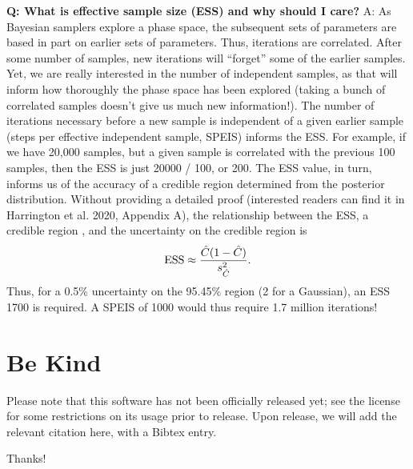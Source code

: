\documentclass[letterpaper, 12pt]{article}
\begin{document}
\noindent \textbf{Q: What is effective sample size (ESS) and why should I care?}
A: As Bayesian samplers explore a phase space, the subsequent sets of parameters
are based in part on earlier sets of parameters.  Thus, iterations are 
correlated.  After some number of samples, new iterations will ``forget'' some 
of the earlier samples.  Yet, we are really interested in the number of 
independent samples, as that will inform how thoroughly the phase space has 
been explored (taking a bunch of correlated samples doesn't give us much new 
information!).  The number of iterations necessary before a new sample is 
independent of a given earlier sample (steps per effective independent sample, 
SPEIS) informs the ESS.  For example, if we have 20,000 samples, but a given 
sample is correlated with the previous 100 samples, then the ESS is just 
20000 / 100, or 200.  The ESS value, in turn, informs us of the accuracy of 
a credible region determined from the posterior distribution.  Without 
providing a detailed proof (interested readers can find it in Harrington et 
al. 2020, Appendix A), the relationship between the ESS, a credible region 
, and the uncertainty on the credible region 
 is
\begin{equation}
{\rm ESS} \approx \frac{\hat{C}(1-\hat{C})}{s\sbp{\hat{C}}{2}}.
\end{equation}
Thus, for a 0.5\% uncertainty on the 95.45\% region (2\math{\sigma} for a 
Gaussian), an ESS \math{\approx} 1700 is required.  A SPEIS of 1000 would 
thus require 1.7 million iterations!


\section{Be Kind}
\label{sec:bekind}
Please note that this software has not been officially released yet; see the 
license for some restrictions on its usage prior to release.  Upon release, 
we will add the relevant citation here, with a Bibtex entry.

\noindent Thanks!


\end{document}

